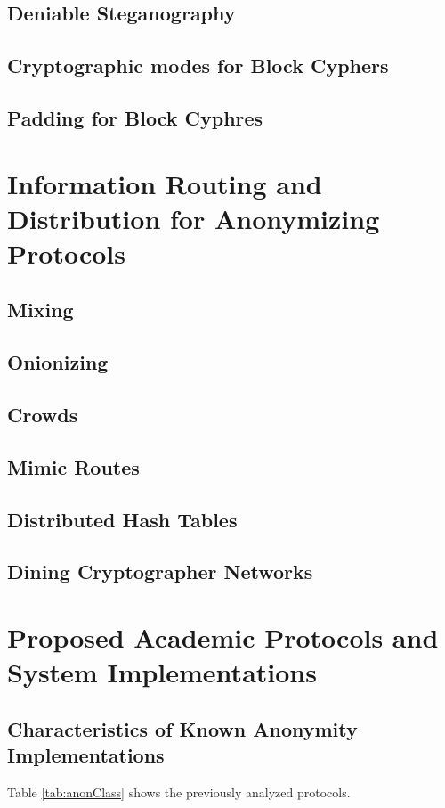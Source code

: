\section{Deniable Steganography}
\section{Cryptographic modes for Block Cyphers}
\section{Padding for Block Cyphres}

\chapter{Information Routing and Distribution for Anonymizing Protocols}
\section{Mixing}
\section{Onionizing}
\section{Crowds}
\section{Mimic Routes}
\section{Distributed Hash Tables}
\section{Dining Cryptographer Networks}

\chapter{Proposed Academic Protocols and System Implementations}
\section{Characteristics of Known Anonymity Implementations}
Table \ref{tab:anonClass} shows the previously analyzed protocols.

